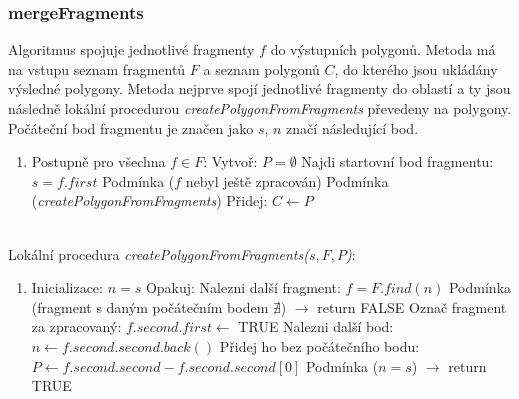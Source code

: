 \documentclass[a4paper, 12pt]{article}
\begin{document}
\subsubsection{mergeFragments}
Algoritmus spojuje jednotlivé fragmenty $f$ do výstupních polygonů. Metoda má na vstupu seznam fragmentů $F$ a seznam polygonů $C$, do kterého jsou ukládány výsledné polygony. Metoda nejprve spojí jednotlivé fragmenty do oblastí a ty jsou následně lokální procedurou \textit{createPolygonFromFragments} převedeny na polygony. Počáteční bod fragmentu je značen jako $s$, $n$ značí následující bod.

\begin{enumerate}
\item[] Postupně pro všechna $f \in F$:
\subitem Vytvoř: $P = \emptyset$
\subitem Najdi startovní bod fragmentu: $s = f.first$
\subitem Podmínka ($f$ nebyl ještě zpracován)
\subsubitem Podmínka (\textit{createPolygonFromFragments})
\subsubitem Přidej: $C \leftarrow P$
\end{enumerate}
~\\

Lokální procedura \textit{createPolygonFromFragments($s, F, P$)}:
\begin{enumerate}
\item[] Inicializace: $n = s$
\subitem Opakuj:
\subsubitem Nalezni další fragment: $f = F.find(n)$
\subsubitem Podmínka (fragment s daným počátečním bodem $\nexists$) $\rightarrow$ return FALSE
\subsubitem Označ fragment za zpracovaný: $f.second.first \leftarrow$ TRUE
\subsubitem Nalezni další bod: $n \leftarrow f.second.second.back()$
\subsubitem Přidej ho bez počátečního bodu: $P \leftarrow f.second.second - {f.second.second[0]}$
\subsubitem Podmínka ($n = s$) $\rightarrow$ return TRUE
\end{enumerate}
\end{document}

